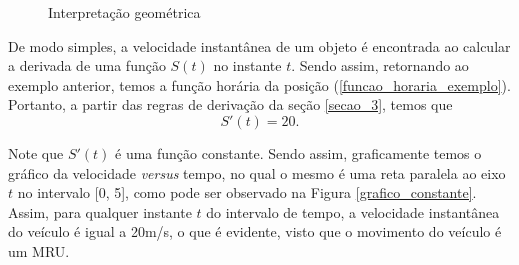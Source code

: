 \documentclass[
	12pt,				%
	openright,			%
    twoside,			%
	a4paper,			%
	chapter=TITLE,		%
	english,			%
	french,				%
	spanish,			%
	brazil				%
	]{abntex2}
\numberwithin{lema}{chapter}
\numberwithin{teorema}{chapter}
\numberwithin{definicao}{chapter}
\numberwithin{exemplo}{chapter}
\numberwithin{figure}{chapter}
\begin{document}
\begin{figure}[h]
	
	\centering
	\caption{Interpretação geométrica}
	\label{funcao_generica}
	\label{grafi}
\end{figure}

De modo simples, a velocidade instantânea de um objeto é encontrada ao calcular a derivada de uma função $S(t)$ no instante $t$. Sendo assim, retornando ao exemplo anterior, temos a função horária da posição (\ref{funcao_horaria_exemplo}). Portanto, a partir das regras de derivação da seção \ref{secao_3}, temos que
\begin{equation}
	S'(t) = 20.
\end{equation}

Note que $S'(t)$ é uma função constante. Sendo assim, graficamente temos o gráfico da velocidade \textit{versus} tempo, no qual o mesmo é uma reta paralela ao eixo $t$ no intervalo [0, 5], como pode ser observado na Figura \ref{grafico_constante}. Assim, para qualquer instante $t$ do intervalo de tempo, a velocidade instantânea do veículo é igual a 20m/s, o que é evidente, visto que o movimento do veículo é um MRU.
\end{document}

